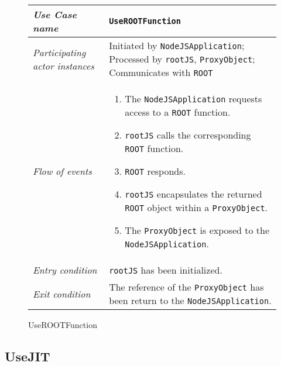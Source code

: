 \begin{figure}[htb]
	\centering
	\begin{longtable}{p{3cm} @{\hskip 1cm} p{12cm}}
		\hline
		
		\textit{Use Case name} & \texttt{UseROOTFunction}\\
		\hline
		
		\textit{Participating actor instances} & Initiated by \texttt{NodeJSApplication};
                Processed by \texttt{rootJS}, \texttt{ProxyObject};
                Communicates with \texttt{ROOT}\\
		\hline
		
		\textit{Flow of events} &
			\begin{enumerate}
				\item The \texttt{NodeJSApplication} requests access to a \texttt{ROOT} function.
				
				\item \texttt{rootJS} calls the corresponding \texttt{ROOT} function.
				
				\item \texttt{ROOT} responds.
				
				\item \texttt{rootJS} encapsulates the returned \texttt{ROOT} object within a \texttt{ProxyObject}.
				
				\item The \texttt{ProxyObject} is exposed to the \texttt{NodeJSApplication}.
			\end{enumerate}
			\\
		\hline
		
		\textit{Entry condition} & \texttt{rootJS} has been initialized.\\
		\hline
		
		\textit{Exit condition} & The reference of the \texttt{ProxyObject} has been return to the \texttt{NodeJSApplication}.\\
        \hline
	\end{longtable}
	
	\caption{UseROOTFunction}
\end{figure}

\pagebreak

\subsection{UseJIT}

